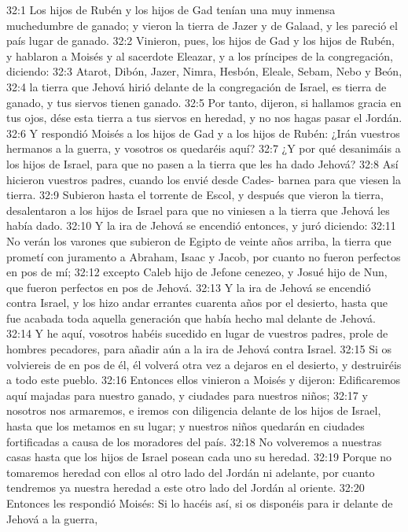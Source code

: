 32:1 Los hijos de Rubén y los hijos de Gad tenían una muy inmensa muchedumbre de ganado; y vieron la tierra de Jazer y de Galaad, y les pareció el país lugar de ganado.  
32:2 Vinieron, pues, los hijos de Gad y los hijos de Rubén, y hablaron a Moisés y al sacerdote Eleazar, y a los príncipes de la congregación, diciendo:  
32:3 Atarot, Dibón, Jazer, Nimra, Hesbón, Eleale, Sebam, Nebo y Beón,  
32:4 la tierra que Jehová hirió delante de la congregación de Israel, es tierra de ganado, y tus siervos tienen ganado.  
32:5 Por tanto, dijeron, si hallamos gracia en tus ojos, dése esta tierra a tus siervos en heredad, y no nos hagas pasar el Jordán.  
32:6 Y respondió Moisés a los hijos de Gad y a los hijos de Rubén: ¿Irán vuestros hermanos a la guerra, y vosotros os quedaréis aquí?  
32:7 ¿Y por qué desanimáis a los hijos de Israel, para que no pasen a la tierra que les ha dado Jehová?  
32:8 Así hicieron vuestros padres, cuando los envié desde Cades- barnea para que viesen la tierra.  
32:9 Subieron hasta el torrente de Escol, y después que vieron la tierra, desalentaron a los hijos de Israel para que no viniesen a la tierra que Jehová les había dado.  
32:10 Y la ira de Jehová se encendió entonces, y juró diciendo:  
32:11 No verán los varones que subieron de Egipto de veinte años arriba, la tierra que prometí con juramento a Abraham, Isaac y Jacob, por cuanto no fueron perfectos en pos de mí;  
32:12 excepto Caleb hijo de Jefone cenezeo, y Josué hijo de Nun, que fueron perfectos en pos de Jehová.  
32:13 Y la ira de Jehová se encendió contra Israel, y los hizo andar errantes cuarenta años por el desierto, hasta que fue acabada toda aquella generación que había hecho mal delante de Jehová. 
32:14 Y he aquí, vosotros habéis sucedido en lugar de vuestros padres, prole de hombres pecadores, para añadir aún a la ira de Jehová contra Israel.  
32:15 Si os volviereis de en pos de él, él volverá otra vez a dejaros en el desierto, y destruiréis a todo este pueblo.  
32:16 Entonces ellos vinieron a Moisés y dijeron: Edificaremos aquí majadas para nuestro ganado, y ciudades para nuestros niños;  
32:17 y nosotros nos armaremos, e iremos con diligencia delante de los hijos de Israel, hasta que los metamos en su lugar; y nuestros niños quedarán en ciudades fortificadas a causa de los moradores del país.  
32:18 No volveremos a nuestras casas hasta que los hijos de Israel posean cada uno su heredad.  
32:19 Porque no tomaremos heredad con ellos al otro lado del Jordán ni adelante, por cuanto tendremos ya nuestra heredad a este otro lado del Jordán al oriente.  
32:20 Entonces les respondió Moisés: Si lo hacéis así, si os disponéis para ir delante de Jehová a la guerra,  
